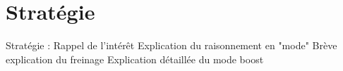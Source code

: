 \section{Stratégie}
Stratégie : 
Rappel de l'intérêt
Explication du raisonnement en "mode"
Brève explication du freinage
Explication détaillée du mode boost
